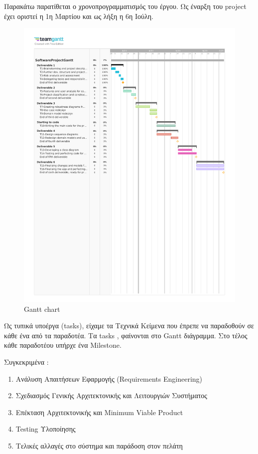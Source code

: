 \documentclass[11pt]{scrartcl} %
\begin{document}
Παρακάτω παρατίθεται ο χρονοπρογραμματισμός του έργου. Ως έναρξη του project έχει οριστεί η 1η Μαρτίου και ως λήξη η 6η Ιούλη.\\
\begin{figure}[ht]
    \hspace{-3.3cm}
    \includegraphics[trim = 0cm 12cm 0cm 2cm, clip]{docs/Team-plan/assets/GanttForProject.pdf}
    \caption{Gantt chart}
\end{figure}

Ως τυπικά υποέργα (tasks), είχαμε τα Τεχνικά Κείμενα που έπρεπε να παραδοθούν σε κάθε ένα από τα παραδοτέα. Τα tasks , φαίνονται στο Gantt διάγραμμα.
Στο τέλος κάθε παραδοτέου υπήρχε ένα Milestone. 

Συγκεκριμένα :
\begin{enumerate}
    \item Ανάλυση Απαιτήσεων Εφαρμογής (Requirements Engineering)
    \item Σχεδιασμός Γενικής Αρχιτεκτονικής και Λειτουργιών Συστήματος
    \item Επέκταση Αρχιτεκτονικής και Minimum Viable Product
    \item Testing Υλοποίησης
    \item Τελικές αλλαγές στο σύστημα και παράδοση στον πελάτη
\end{enumerate}
\end{document}
